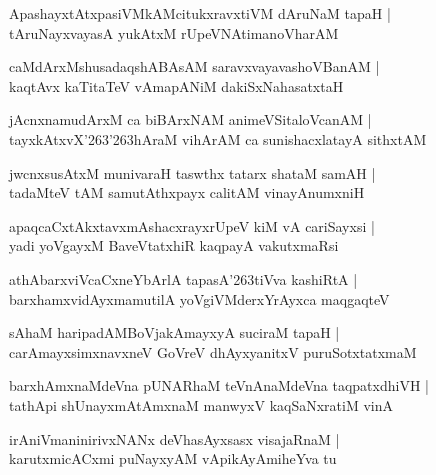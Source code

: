 \documentclass[twoside,12pt,openright]{book}
\def\S{\char'263}
\newcounter{shloka}[chapter]
\begin{document}
\begin{shloka}%
ApashayxtAtxpasiVMkAMcitukxravxtiVM dAruNaM tapaH |\\
tAruNayxvayasA yukAtxM rUpeVNAtimanoVharAM 
\end{shloka}

\begin{shloka}%
caMdArxMshusadaqshABAsAM saravxvayavashoVBanAM |\\
kaqtAvx kaTitaTeV vAmapANiM dakiSxNahasatxtaH 
\end{shloka}

\begin{shloka}%
jAcnxnamudArxM ca biBArxNAM animeVSitaloVcanAM |\\
tayxkAtxvX\S \S hAraM vihArAM ca sunishacxlatayA sithxtAM 
\end{shloka}

\begin{shloka}%
jwcnxsusAtxM munivaraH taswthx tatarx shataM samAH |\\
tadaMteV tAM samutAthxpayx calitAM vinayAnumxniH 
\end{shloka}

\begin{shloka}%
apaqcaCxtAkxtavxmAshacxrayxrUpeV kiM vA cariSayxsi |\\
yadi yoVgayxM BaveVtatxhiR kaqpayA vakutxmaRsi 
\end{shloka}

\begin{shloka}%
athAbarxviVcaCxneYbArlA tapasA\S tiVva kashiRtA |\\
barxhamxvidAyxmamutilA yoVgiVMderxYrAyxca maqgaqteV 
\end{shloka}

\begin{shloka}%
sAhaM haripadAMBoVjakAmayxyA suciraM tapaH |\\
carAmayxsimxnavxneV GoVreV dhAyxyanitxV puruSotxtatxmaM 
\end{shloka}

\begin{shloka}%
barxhAmxnaMdeVna pUNARhaM teVnAnaMdeVna taqpatxdhiVH |\\
tathApi shUnayxmAtAmxnaM manwyxV kaqSaNxratiM vinA 
\end{shloka}

\begin{shloka}%
irAniVmaninirivxNANx deVhasAyxsasx visajaRnaM |\\
karutxmicACxmi puNayxyAM vApikAyAmiheYva tu 
\end{shloka}
\end{document}
